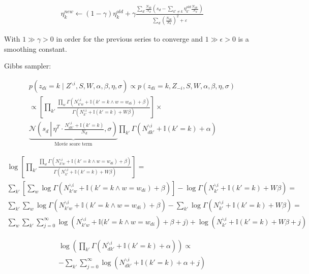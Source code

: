 \documentclass[a4paper,10pt]{report}
\begin{document}
\begin{multline*}
\eta_k^{new} \leftarrow (1 - \gamma) \eta_k^{old} + \gamma \frac{\sum_d \frac{N_{dk}}{N_d} \left( s_d - \sum_{k' \ne k} \eta_{k'}^{old} \frac{N_{dk'}}{N_d} \right)}{\sum_d \left( \frac{N_{dk}}{N_d}  \right)^2 + \varepsilon}
\end{multline*}

With $1 \gg \gamma > 0$ in order for the previous series to converge and $1 \gg \epsilon > 0$ is a smoothing constant.

Gibbs sampler:

\begin{multline*}
p(z_{di} = k \mid Z^{\backslash i}, S, W, \alpha, \beta, \eta, \sigma) \propto p(z_{di} = k, Z_{-i}, S, W, \alpha, \beta, \eta, \sigma) \\
\propto \left[ \prod_{k'} \frac{\prod_w \Gamma(N_{{k'}w}^{\backslash i} + \mathbb{I}(k' = k \wedge w = w_{di}) + \beta)}{\Gamma(N_{k'}^{\backslash i} + \mathbb{I}(k' = k) + W \beta)} \right] \times \\
\underbrace{\mathcal{N}\left(s_d\, \left|\, \eta^T \cdot \frac{N_{d{k'}}^{\backslash i} + \mathbb{I}(k' = k)}{N_d}, \sigma\right. \right)}_\text{Movie score term} \prod_{k'} \Gamma(N_{d{k'}}^{\backslash i} + \mathbb{I}(k' = k) + \alpha)
\end{multline*}

\begin{multline*}
\log \left[ \prod_{k'} \frac{\prod_w \Gamma(N_{{k'}w}^{\backslash i} + \mathbb{I}(k' = k \wedge w = w_{di}) + \beta)}{\Gamma(N_{k'}^{\backslash i} + \mathbb{I}(k' = k) + W \beta)} \right] = \\
\sum_{k'} \left[ \sum_w \log \Gamma(N_{{k'}w}^{\backslash i} + \mathbb{I}(k' = k \wedge w = w_{di}) + \beta) \right] - \log \Gamma(N_{k'}^{\backslash i} + \mathbb{I}(k' = k) + W \beta) = \\
\sum_{k'} \sum_w \log \Gamma(N_{{k'}w}^{\backslash i} + \mathbb{I}(k' = k \wedge w = w_{di}) + \beta) - \sum_{k'} \log \Gamma(N_{k'}^{\backslash i} + \mathbb{I}(k' = k) + W \beta) = \\
\sum_w \sum_{k'} \sum_{j = 0}^\infty \log \left(N_{{k'}w}^{\backslash i} + \mathbb{I}(k' = k \wedge w = w_{di}\right) + \beta + j) + \log \left(N_{k'}^{\backslash i} + \mathbb{I}(k' = k) + W \beta + j\right)
\end{multline*}

\begin{multline*}
 \log \left( \prod_{k'} \Gamma(N_{d{k'}}^{\backslash i} + \mathbb{I}(k' = k) + \alpha) \right) \propto \\
- \sum_{k'} \sum_{j = 0}^\infty \log (N_{dk'}^{\backslash i} + \mathbb{I}(k' = k) + \alpha + j)
\end{multline*}
 
\end{document}
